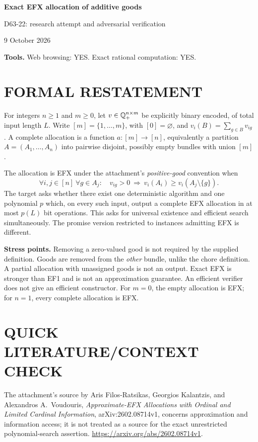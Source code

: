 \documentclass[11pt,a4paper]{article}
\theoremstyle{definition}\newtheorem{definition}[theorem]{Definition}
\theoremstyle{remark}\newtheorem{remark}[theorem]{Remark}
\newcommand{\1}{\mathbf 1}
\begin{document}
\begin{center}
{\Large\bfseries Exact EFX allocation of additive goods}\par
\medskip
{\large D63-22: research attempt and adversarial verification}\par
9 October 2026
\end{center}
\textbf{Tools.} Web browsing: YES. Exact rational computation: YES.\par
\section{FORMAL RESTATEMENT}
For integers $n\ge1$ and $m\ge0$, let $v\in\mathbb Q_+^{n\times m}$ be explicitly binary encoded, of total input length $L$. Write $[m]=\{1,\ldots,m\}$, with $[0]=\varnothing$, and $v_i(B)=\sum_{g\in B}v_{ig}$. A complete allocation is a function $a:[m]\to[n]$, equivalently a partition $A=(A_1,\ldots,A_n)$ into pairwise disjoint, possibly empty bundles with union $[m]$.

The allocation is EFX under the attachment's \emph{positive-good} convention when
\[
 \forall i,j\in[n]\ \forall g\in A_j:\quad
 v_{ig}>0\ \Longrightarrow\ v_i(A_i)\ge v_i(A_j\setminus\{g\}).
\]
The target asks whether there exist one deterministic algorithm and one polynomial $p$ which, on every such input, output a complete EFX allocation in at most $p(L)$ bit operations. This asks for universal existence and efficient search simultaneously. The promise version restricted to instances admitting EFX is different.

\textbf{Stress points.} Removing a zero-valued good is not required by the supplied definition. Goods are removed from the \emph{other} bundle, unlike the chore definition. A partial allocation with unassigned goods is not an output. Exact EFX is stronger than EF1 and is not an approximation guarantee. An efficient verifier does not give an efficient constructor. For $m=0$, the empty allocation is EFX; for $n=1$, every complete allocation is EFX.

\section{QUICK LITERATURE/CONTEXT CHECK}
The attachment's source by Aris Filos-Ratsikas, Georgios Kalantzis, and Alexandros A.~Voudouris, \emph{Approximate-EFX Allocations with Ordinal and Limited Cardinal Information}, arXiv:2602.08714v1, concerns approximation and information access; it is not treated as a source for the exact unrestricted polynomial-search assertion. \url{https://arxiv.org/abs/2602.08714v1}.
\end{document}
